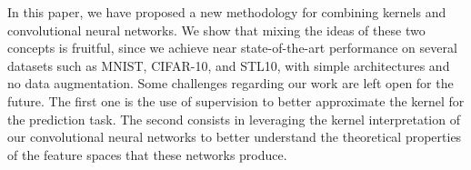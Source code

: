 \vsb
In this paper, we have proposed a new methodology for combining kernels
and convolutional neural networks. We show that  
mixing the ideas of these two concepts is fruitful,
since we achieve near state-of-the-art performance 
on several datasets such as MNIST, CIFAR-10, and STL10, with simple architectures
and no data augmentation.
Some challenges regarding our work are left open for the future. The first one
is the use of supervision to better approximate the kernel for the prediction
task. The second consists in leveraging the kernel interpretation of our
convolutional neural networks to better understand the theoretical properties
of the feature spaces that these networks produce.

